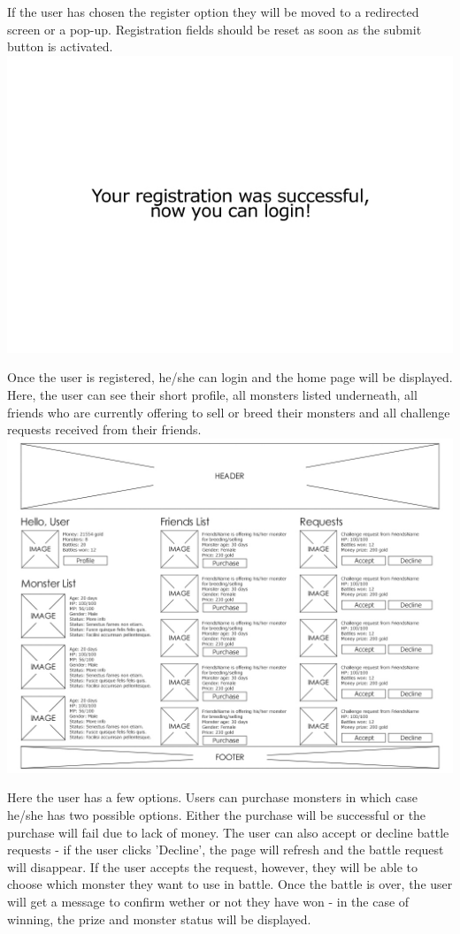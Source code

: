 \documentclass[a4paper]{article}
\begin{document}
If the user has chosen the register option they will be moved to a redirected screen or a pop-up. Registration fields should be reset as soon as the submit button is activated.\\
\includegraphics[width=\textwidth]{img/UI18.jpg}
\clearpage

Once the user is registered, he/she can login and the home page will be displayed. Here, the user can see their short profile, all monsters listed underneath, all friends who are currently offering to sell or breed their monsters and all challenge requests received from their friends.\\

\includegraphics[width=\textwidth]{img/UI3.jpg}

Here the user has a few options. Users can purchase monsters in which case he/she has two possible options. Either the purchase will be successful or the purchase will fail due to lack of money. The user can also accept or decline battle requests - if the user clicks 'Decline', the page will refresh and the battle request will disappear. If the user accepts the request, however, they will be able to choose which monster they want to use in battle. Once the battle is over, the user will get a message to confirm wether or not they have won - in the case of winning, the prize and monster status will be displayed.
\clearpage
\end{document}
